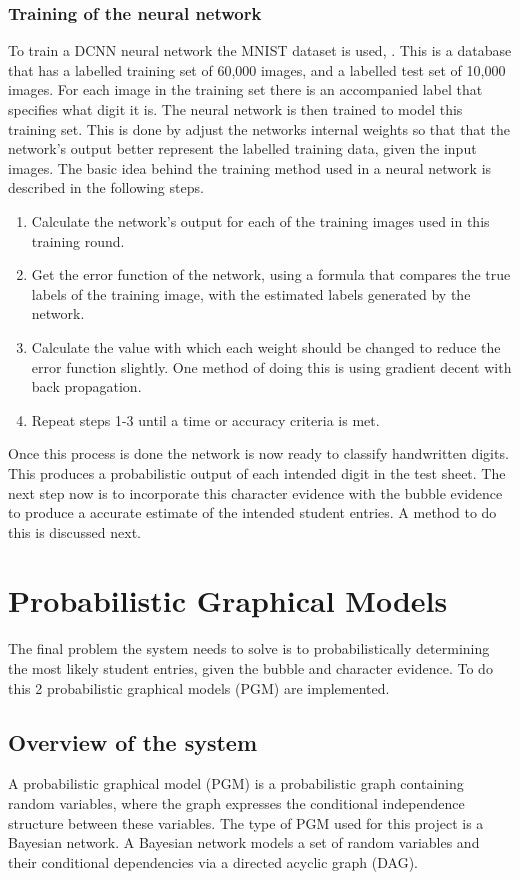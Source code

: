 \subsubsection{Training of the neural network}
\label{sec:trainNN}
To train a DCNN neural network the MNIST dataset is used, \citet{mnist}. This is a database that has a labelled training set of 60,000 images, and a labelled test set of 10,000 images. For each image in the training set there is an accompanied label that specifies what digit it is. The neural network is then trained to model this training set. This is done by adjust the networks internal weights so that that the network's output better represent the labelled training data, given the input images. The basic idea behind the training method used in a neural network is described in the following steps.

\begin{enumerate}
\item Calculate the network's output for each of the training images used in this training round.
\item Get the error function of the network, using a formula that compares the true labels of the training image, with the estimated labels generated by the network.
\item Calculate the value with which each weight should be changed to reduce the error function slightly. One method of doing this is using gradient decent with back propagation.
\item Repeat steps 1-3 until a time or accuracy criteria is met.
\end{enumerate}

Once this process is done the network is now ready to classify handwritten digits. This produces a probabilistic output of each intended digit in the test sheet. The next step now is to incorporate this character evidence with the bubble evidence to produce a accurate estimate of the intended student entries. A method to do this is discussed next.

\section{Probabilistic Graphical Models}
\label{sec:PGM}
The final problem the system needs to solve is to probabilistically determining the most likely student entries, given the bubble and character evidence. To do this 2 probabilistic graphical models (PGM) are implemented.

\subsection{Overview of the system}
A probabilistic graphical model (PGM) is a probabilistic graph containing random variables, where the graph expresses the conditional independence structure between these variables. The type of PGM used for this project is a Bayesian network. A Bayesian network models a set of random variables and their conditional dependencies via a directed acyclic graph (DAG).

